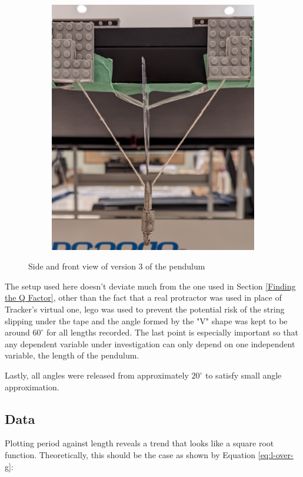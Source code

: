 \documentclass[12pt]{article}
\begin{document}
{\begin{figure}[!hptb]
\begin{subfigure}{0.49\textwidth}
        \includegraphics[width=\textwidth]{../figures/exp_setup3_front.png}
    \end{subfigure}
    \caption{Side and front view of version 3 of the pendulum}
    \label{fig:figure 5}
\end{figure}

The setup used here doesn't deviate much from the one used in Section \ref{Finding the Q Factor}, other than the fact that a real protractor was used in place of Tracker's virtual one, lego was used to prevent the potential risk of the string slipping under the tape and the angle formed by the "V" shape was kept to be around $60^\circ$ for all lengths recorded. The last point is especially important so that any dependent variable under investigation can only depend on one independent variable, the length of the pendulum.

Lastly, all angles were released from approximately $20^\circ$ to satisfy small angle approximation.

\subsection{Data}
Plotting period against length reveals a trend that looks like a square root function. Theoretically, this should be the case as shown by Equation \ref{eq:l-over-g}:

}
\end{document}
